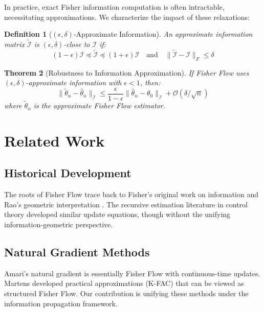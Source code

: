 \documentclass[11pt]{article}
\newtheorem{theorem}{Theorem}
\newtheorem{definition}[theorem]{Definition}
\begin{document}
In practice, exact Fisher information computation is often intractable, necessitating approximations. We characterize the impact of these relaxations:

\begin{definition}[$(\epsilon, \delta)$-Approximate Information]
An approximate information matrix $\tilde{\mathcal{I}}$ is $(\epsilon, \delta)$-close to $\mathcal{I}$ if:
\begin{equation}
(1-\epsilon)\mathcal{I} \preceq \tilde{\mathcal{I}} \preceq (1+\epsilon)\mathcal{I} \quad \text{and} \quad \|\tilde{\mathcal{I}} - \mathcal{I}\|_F \leq \delta
\end{equation}
\end{definition}

\begin{theorem}[Robustness to Information Approximation]
\label{thm:approximation}
If Fisher Flow uses $(\epsilon, \delta)$-approximate information with $\epsilon < 1$, then:
\begin{equation}
\|\tilde{\theta}_n - \hat{\theta}_n\|_{\mathcal{I}} \leq \frac{\epsilon}{1-\epsilon}\|\hat{\theta}_n - \theta_0\|_{\mathcal{I}} + \mathcal{O}(\delta/\sqrt{n})
\end{equation}
where $\tilde{\theta}_n$ is the approximate Fisher Flow estimator.
\end{theorem}

\section{Related Work}

\subsection{Historical Development}

The roots of Fisher Flow trace back to Fisher's original work on information \cite{fisher1925statistical} and Rao's geometric interpretation \cite{rao1945information}. The recursive estimation literature in control theory \cite{ljung1983theory} developed similar update equations, though without the unifying information-geometric perspective.

\subsection{Natural Gradient Methods}

Amari's natural gradient \cite{amari1998natural} is essentially Fisher Flow with continuous-time updates. Martens \cite{martens2015optimizing} developed practical approximations (K-FAC) that can be viewed as structured Fisher Flow. Our contribution is unifying these methods under the information propagation framework.
\end{document}
